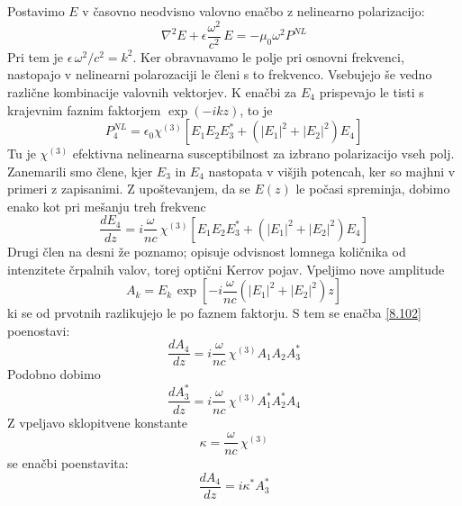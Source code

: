 \documentclass[11pt,fleqn]{book} %
\begin{document}
Postavimo $E$ v časovno neodvisno valovno enačbo z nelinearno polarizacijo:
\begin{equation}
\nabla^{2}E+\epsilon\frac{\omega^{2}}{c^{2}}\, E=-\mu_{0}\omega^{2}P^{NL}\label{8.100}
\end{equation}
 Pri tem je $\epsilon\,\omega^{2}/c^{2}=k^{2}$. Ker obravnavamo le
polje pri osnovni frekvenci, nastopajo v nelinearni polarozaciji le
členi s to frekvenco. Vsebujejo še vedno različne kombinacije valovnih
vektorjev. K enačbi za $E_{4}$ prispevajo le tisti s krajevnim faznim
faktorjem $\exp(-ikz)$, to je 
\begin{equation}
P_{4}^{NL}=\epsilon_{0}\chi^{\left(3\right)}[E_{1}E_{2}E_{3}^{*}+(\left|E_{1}\right|^{2}+\left|E_{2}\right|^{2})E_{4}]\label{8.101}
\end{equation}
 Tu je $\chi^{\left(3\right)}$ efektivna nelinearna susceptibilnost
za izbrano polarizacijo vseh polj. Zanemarili smo člene, kjer $E_{3}$
in $E_{4}$ nastopata v višjih potencah, ker so majhni v primeri z
zapisanimi. Z upoštevanjem, da se $E\left(z\right)$ le počasi spreminja,
dobimo enako kot pri mešanju treh frekvenc 
\begin{equation}
\frac{dE_{4}}{dz}=i\frac{\omega}{nc}\,\chi^{\left(3\right)}\left[E_{1}E_{2}E_{3}^{*}+(\left|E_{1}\right|^{2}+\left|E_{2}\right|^{2})E_{4}\right]\label{8.102}
\end{equation}
 Drugi člen na desni že poznamo; opisuje odvisnost lomnega količnika
od intenzitete črpalnih valov, torej optični Kerrov pojav. Vpeljimo
nove amplitude 
\begin{equation}
A_{k}=E_{k\,}\exp\left[-i\frac{\omega}{nc}\left(\left|E_{1}\right|^{2}+\left|E_{2}\right|^{2}\right)z\right]\label{8.103}
\end{equation}
 ki se od prvotnih razlikujejo le po faznem faktorju. S tem se enačba
\ref{8.102} poenostavi: 
\begin{equation}
\frac{dA_{4}}{dz}=i\frac{\omega}{nc}\,\chi^{\left(3\right)}A_{1}A_{2}A_{3}^{*}\label{8.104}
\end{equation}
 Podobno dobimo 
\begin{equation}
\frac{dA_{3}^{*}}{dz}=i\frac{\omega}{nc}\,\chi^{\left(3\right)}A_{1}^{*}A_{2}^{*}A_{4}\label{8.105}
\end{equation}
 Z vpeljavo sklopitvene konstante 
\begin{equation}
\kappa=\frac{\omega}{nc}\,\chi^{\left(3\right)}\label{8.106}
\end{equation}
 se enačbi poenstavita: 
\[
\frac{dA_{4}}{dz}=i\kappa^{*}A_{3}^{*}
\]
 
\end{document}
